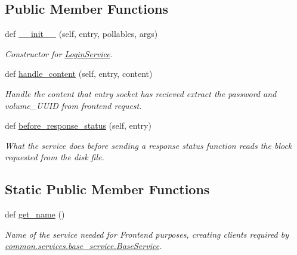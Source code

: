 \subsection*{Public Member Functions}
\begin{DoxyCompactItemize}
\item 
def \hyperlink{class_r_a_i_d5_1_1block__device_1_1services_1_1login__service_1_1_login_service_a3e9d974a2333ef0cb54874b65842ca53}{\+\_\+\+\_\+init\+\_\+\+\_\+} (self, entry, pollables, args)
\begin{DoxyCompactList}\small\item\em Constructor for \hyperlink{class_r_a_i_d5_1_1block__device_1_1services_1_1login__service_1_1_login_service}{Login\+Service}. \end{DoxyCompactList}\item 
def \hyperlink{class_r_a_i_d5_1_1block__device_1_1services_1_1login__service_1_1_login_service_a0dbcb210b5b1bbd67a0321b86c21824f}{handle\+\_\+content} (self, entry, content)
\begin{DoxyCompactList}\small\item\em Handle the content that entry socket has recieved extract the password and volume\+\_\+\+U\+U\+ID from frontend request. \end{DoxyCompactList}\item 
def \hyperlink{class_r_a_i_d5_1_1block__device_1_1services_1_1login__service_1_1_login_service_ad6279990022af1400907394ad4fb2fb4}{before\+\_\+response\+\_\+status} (self, entry)
\begin{DoxyCompactList}\small\item\em What the service does before sending a response status function reads the block requested from the disk file. \end{DoxyCompactList}\end{DoxyCompactItemize}
\subsection*{Static Public Member Functions}
\begin{DoxyCompactItemize}
\item 
def \hyperlink{class_r_a_i_d5_1_1block__device_1_1services_1_1login__service_1_1_login_service_a8501e68a944ed20a107108801926b1be}{get\+\_\+name} ()
\begin{DoxyCompactList}\small\item\em Name of the service needed for Frontend purposes, creating clients required by \hyperlink{class_r_a_i_d5_1_1common_1_1services_1_1base__service_1_1_base_service}{common.\+services.\+base\+\_\+service.\+Base\+Service}. \end{DoxyCompactList}\end{DoxyCompactItemize}



